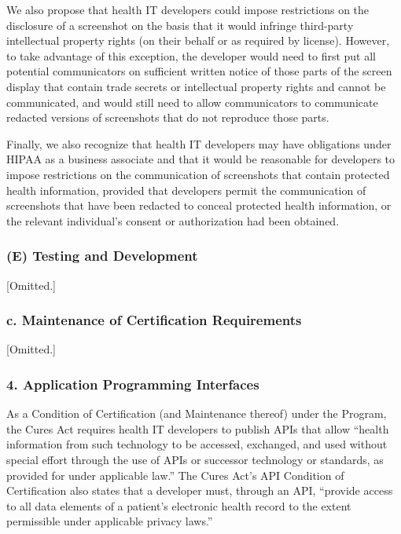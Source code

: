 \documentclass[twoside,11pt]{article}
\begin{document}
          We also propose that health IT developers could impose restrictions on the disclosure of a screenshot on the basis that it would infringe third-party intellectual property rights (on their behalf or as required by license). However, to take advantage of this exception, the developer would need to first put all potential communicators on sufficient written notice of those parts of the screen display that contain trade secrets or intellectual property rights and cannot be communicated, and would still need to allow communicators to communicate redacted versions of screenshots that do not reproduce those parts.


          Finally, we also recognize that health IT developers may have obligations under HIPAA as a business associate and that it would be reasonable for developers to impose restrictions on the communication of screenshots that contain protected health information, provided that developers permit the communication of screenshots that have been redacted to conceal protected health information, or the relevant individual's consent or authorization had been obtained.


          \subsubsection{(E) Testing and Development}

          [Omitted.]


          \subsubsection{c. Maintenance of Certification Requirements}

[Omitted.]


          \subsubsection{4. Application Programming Interfaces}

          As a Condition of Certification (and Maintenance thereof) under the Program, the Cures Act requires health IT developers to publish APIs that allow “health information from such technology to be accessed, exchanged, and used without special effort through the use of APIs or successor technology or standards, as provided for under applicable law.” The Cures Act's API Condition of Certification also states that a developer must, through an API, “provide access to all data elements of a patient's electronic health record to the extent permissible under applicable privacy laws.”
\end{document}

